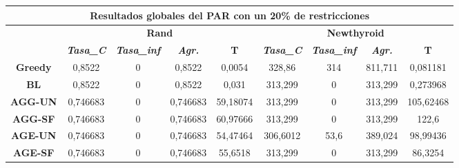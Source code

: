 \documentclass[12pt, spanish]{article}
\begin{document}
\begin{table}[H]
\footnotesize
\begin{tabular}{|c|c|c|c|c|c|c|c|c|}
\hline
\multicolumn{9}{|c|}{\textbf{Resultados globales del PAR con un 20\% de restricciones}}                                                                                                                                  \\ \hline
\multirow{2}{*}{}        & \multicolumn{4}{c|}{\textbf{Rand}}                                                            & \multicolumn{4}{c|}{\textbf{Newthyroid}}                                                      \\ \cline{2-9} 
                         & \textit{\textbf{Tasa\_C}} & \textit{\textbf{Tasa\_inf}} & \textit{\textbf{Agr.}} & \textbf{T} & \textit{\textbf{Tasa\_C}} & \textit{\textbf{Tasa\_inf}} & \textit{\textbf{Agr.}} & \textbf{T} \\ \hline
\textbf{Greedy}          & 0,8522                    & 0                           & 0,8522                 & 0,0054     & 328,86                    & 314                         & 811,711                & 0,081181   \\ \hline
\textbf{BL}              & 0,8522                    & 0                           & 0,8522                 & 0,031      & 313,299                   & 0                           & 313,299                & 0,273968   \\ \hline
\textbf{AGG-UN}          & 0,746683                  & 0                           & 0,746683               & 59,18074   & 313,299                   & 0                           & 313,299                & 105,62468  \\ \hline
\textbf{AGG-SF}          & 0,746683                  & 0                           & 0,746683               & 60,97666   & 313,299                   & 0                           & 313,299                & 122,6      \\ \hline
\textbf{AGE-UN}          & 0,746683                  & 0                           & 0,746683               & 54,47464   & 306,6012                  & 53,6                        & 389,024                & 98,99436   \\ \hline
\textbf{AGE-SF}          & 0,746683                  & 0                           & 0,746683               & 55,6518    & 313,299                   & 0                           & 313,299                & 86,3254    \\ \hline

\end{tabular}
\end{table}
\end{document}
